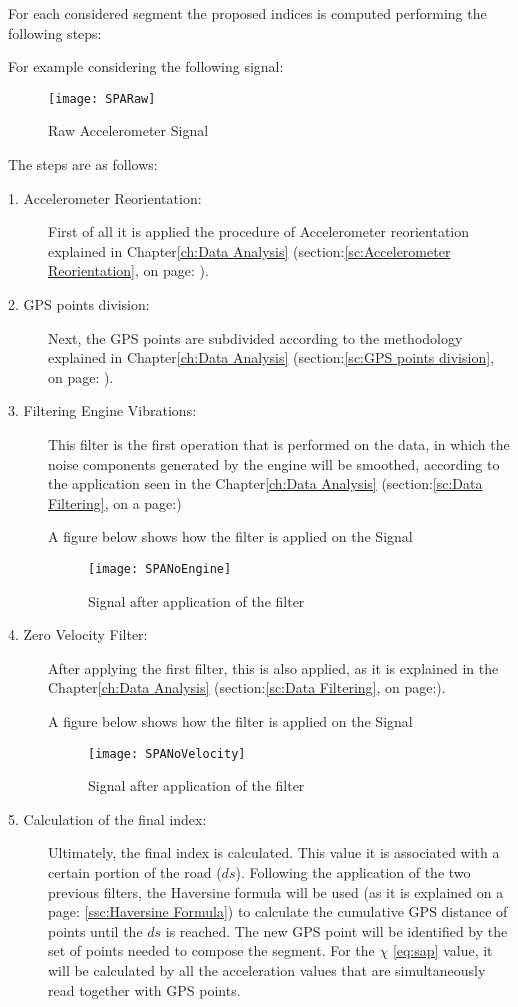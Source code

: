 \documentclass[tesi]{subfiles}
\begin{document}
For each considered segment the proposed indices is computed performing the following steps:

For example considering the following signal:
\begin{figure}[H]
\centering
\texttt{[image: SPARaw]}
\caption{Raw Accelerometer Signal}
\end{figure}

The steps are as follows:

\begin{description}
\item[1. Accelerometer Reorientation:] First of all it is applied the procedure of Accelerometer reorientation explained in Chapter\ref{ch:Data Analysis} (section:\ref{sc:Accelerometer Reorientation}, on page: \pageref{sc:Accelerometer Reorientation}).
\item[2. GPS points division:] Next, the GPS points are subdivided according to the methodology explained in Chapter\ref{ch:Data Analysis} (section:\ref{sc:GPS points division}, on page: \pageref{sc:GPS points division}).
\item[3. Filtering Engine Vibrations:] This filter is the first operation that is performed on the data, in which the noise components generated by the engine will be smoothed, according to the application seen in the Chapter\ref{ch:Data Analysis} (section:\ref{sc:Data Filtering}, on a page:\pageref{sssc:Remove Engine Vibrations Filter})

A figure below shows how the filter is applied on the Signal

\begin{figure}[H]
\centering
\texttt{[image: SPANoEngine]}
\caption{Signal after application of the filter}
\end{figure}
\item[4. Zero Velocity Filter:] After applying the first filter, this is also applied, as it is explained in the Chapter\ref{ch:Data Analysis} (section:\ref{sc:Data Filtering}, on page:\pageref{sssc:Zero Velocity Filter}).

A figure below shows how the filter is applied on the Signal
\begin{figure}[H]
\centering
\texttt{[image: SPANoVelocity]}
\caption{Signal after application of the filter}
\end{figure}

\item[5. Calculation of the final index:] Ultimately, the final index is calculated.
This value it is associated with a certain portion of the road ($ds$). Following the application of the two previous filters, the Haversine formula will be used (as it is explained on a page: \ref{ssc:Haversine Formula}) to calculate the cumulative GPS distance of points until the $ds$ is reached. The new GPS point will be identified by the set of points needed to compose the segment. For the $\chi$ \thinspace \ref{eq:sap} value, it will be calculated by all the acceleration values that are simultaneously read together with GPS points.


\end{description}
\end{document}
